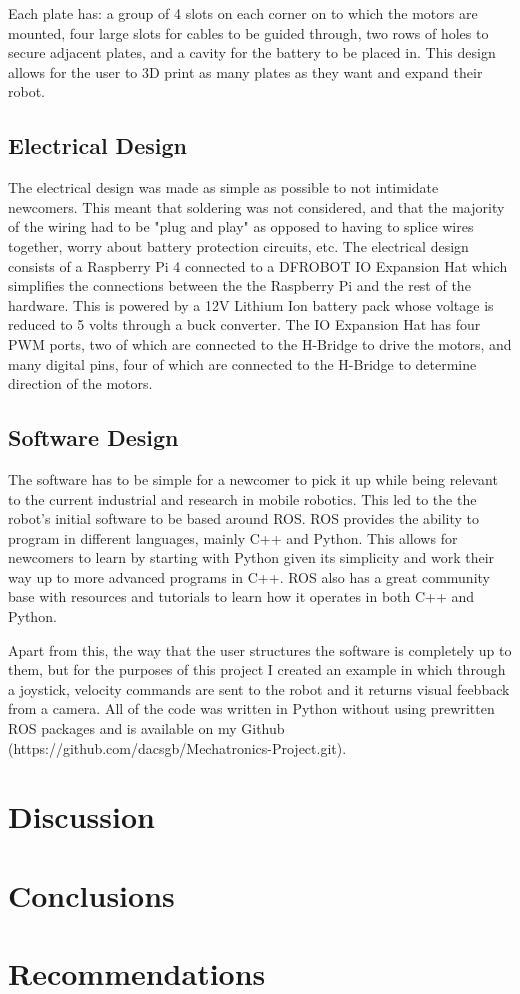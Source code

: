 \documentclass[12pt, letterpaper,titlepage]{article}
\begin{document}
	Each plate has: a group of 4 slots on each corner on to which the motors are mounted, four large slots for cables to be guided through, two rows of holes to secure adjacent plates, and a cavity for the battery to be placed in. This design allows for the user to 3D print as many plates as they want and expand their robot.
	

\subsection{Electrical Design}

	The electrical design was made as simple as possible to not intimidate newcomers. This meant that soldering was not considered, and that the majority of the wiring had to be "plug and play" as opposed to having to splice wires together, worry about battery protection circuits, etc. The electrical design consists of a Raspberry Pi 4 connected to a  DFROBOT IO Expansion Hat which simplifies the connections between the the Raspberry Pi and the rest of the hardware. This is powered by a 12V Lithium Ion battery pack whose voltage is reduced to 5 volts through a buck converter. The IO Expansion Hat has four PWM ports, two of which are connected to the H-Bridge to drive the motors, and many digital pins, four of which are connected to the H-Bridge to determine direction of the motors.

\subsection{Software Design}

	The software has to be simple for a newcomer to pick it up while being relevant to the current industrial and research in mobile robotics. This led to the the robot's initial software to be based around ROS. ROS provides the ability to program in different languages, mainly C++ and Python. This allows for newcomers to learn by starting with Python given its simplicity and work their way up to more advanced programs in C++. ROS also has a great community base with resources and tutorials to learn how it operates in both C++ and Python. 

	Apart from this, the way that the user structures the software is completely up to them, but for the purposes of this project I created an example in which through a joystick, velocity commands are sent to the robot and it returns visual feebback from a camera. All of the code was written in Python without using prewritten ROS packages and is available on my Github (https://github.com/dacsgb/Mechatronics-Project.git).

\section{Discussion}

\section{Conclusions}

\section{Recommendations}



\end{document}
